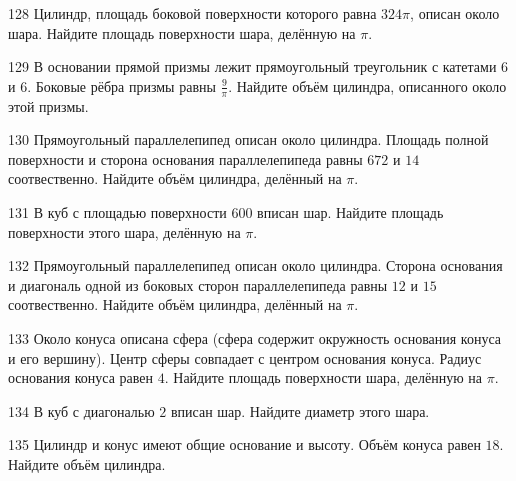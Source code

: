 \documentclass[4apaper]{article}
\begin{document}
\begin{taskBN}{128}
 Цилиндр, площадь боковой поверхности которого равна $324\pi$, описан около шара. Найдите площадь поверхности шара, делённую на $\pi$.
\end{taskBN}

\begin{taskBN}{129}
В основании прямой призмы лежит прямоугольный треугольник с катетами $6$ и $6$. Боковые рёбра призмы равны $\frac{9}{\pi}$. Найдите объём цилиндра, описанного около этой призмы.
\end{taskBN}

\begin{taskBN}{130}
Прямоугольный параллелепипед описан около цилиндра. Площадь полной поверхности и сторона основания параллелепипеда равны $672$ и $14$ соотвественно. Найдите объём цилиндра, делённый на $\pi$.
\end{taskBN}

\begin{taskBN}{131}
В куб с площадью поверхности $600$ вписан шар. Найдите площадь поверхности этого шара, делённую на $\pi$.
\end{taskBN}

\begin{taskBN}{132}
Прямоугольный параллелепипед описан около цилиндра. Сторона основания и диагональ одной из боковых сторон параллелепипеда равны $12$ и $15$ соотвественно. Найдите объём цилиндра, делённый на $\pi$.
\end{taskBN}

\begin{taskBN}{133}
Около конуса описана сфера (сфера содержит окружность основания конуса и его вершину). Центр сферы совпадает с центром основания конуса. Радиус основания конуса равен $4$. Найдите площадь поверхности шара, делённую на $\pi$.
\end{taskBN}

\begin{taskBN}{134}
В куб с диагональю $2$ вписан шар. Найдите диаметр этого шара.
\end{taskBN}

\begin{taskBN}{135}
Цилиндр и конус имеют общие основание и высоту. Объём конуса равен $18$. Найдите объём цилиндра.
\end{taskBN}
\end{document}
